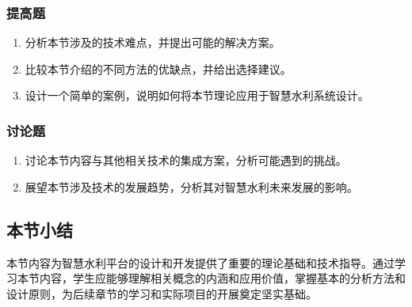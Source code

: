 \hypertarget{ux63d0ux9ad8ux9898-3}{%
\subsubsection{提高题}\label{ux63d0ux9ad8ux9898-3}}

\begin{enumerate}
\def\labelenumi{\arabic{enumi}.}
\tightlist
\item
  分析本节涉及的技术难点，并提出可能的解决方案。
\item
  比较本节介绍的不同方法的优缺点，并给出选择建议。
\item
  设计一个简单的案例，说明如何将本节理论应用于智慧水利系统设计。
\end{enumerate}

\hypertarget{ux8ba8ux8bbaux9898-3}{%
\subsubsection{讨论题}\label{ux8ba8ux8bbaux9898-3}}

\begin{enumerate}
\def\labelenumi{\arabic{enumi}.}
\tightlist
\item
  讨论本节内容与其他相关技术的集成方案，分析可能遇到的挑战。
\item
  展望本节涉及技术的发展趋势，分析其对智慧水利未来发展的影响。
\end{enumerate}

\hypertarget{ux672cux8282ux5c0fux7ed3-3}{%
\subsection{本节小结}\label{ux672cux8282ux5c0fux7ed3-3}}

本节内容为智慧水利平台的设计和开发提供了重要的理论基础和技术指导。通过学习本节内容，学生应能够理解相关概念的内涵和应用价值，掌握基本的分析方法和设计原则，为后续章节的学习和实际项目的开展奠定坚实基础。